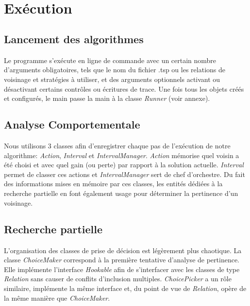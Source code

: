 \documentclass[a4paper,10pt]{report}
\begin{document}
\section{Exécution}
\subsection{Lancement des algorithmes}
\paragraph{}
  Le programme s'exécute en ligne de commande avec un certain nombre d'arguments
obligatoires, tels que le nom du fichier .tsp ou les relations de voisinage et
stratégies à utiliser, et des arguments optionnels activant ou désactivant
certains contrôles ou écritures de trace. Une fois tous les objets créés et
configurés, le main passe la main à la classe \textit{Runner} (voir annexe).

\subsection{Analyse Comportementale}
\paragraph{}
  Nous utilisons 3 classes afin d'enregistrer chaque pas de l'exécution de notre
algorithme: \textit{Action}, \textit{Interval} et \textit{IntervalManager}.
\textit{Action} mémorise quel voisin a été choisi et avec quel gain (ou perte)
par rapport à la solution actuelle. \textit{Interval} permet de classer ces
actions et \textit{IntervalManager} sert de chef d'orchestre. Du fait des
informations mises en mémoire par ces classes, les entités dédiées à la
recherche partielle en font également usage pour déterminer la pertinence d'un
voisinage.

\subsection{Recherche partielle}
\paragraph{}
  L'organisation des classes de prise de décision est légèrement plus chaotique.
La classe \textit{ChoiceMaker} correspond à la première tentative d'analyse de
pertinence. Elle implémente l'interface \textit{Hookable} afin de s'interfacer
avec les classes de type \textit{Relation} sans causer de conflits d'inclusion
multiples. \textit{ChoicePicker} a un rôle similaire, implémente la même
interface et, du point de vue de \textit{Relation}, opère de la même manière
que \textit{ChoiceMaker}.
\end{document}
